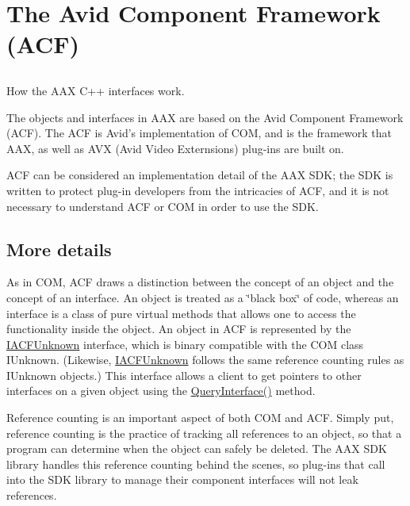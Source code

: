 \hypertarget{a00827}{}\section{The Avid Component Framework (A\+CF)}
\label{a00827}


\subsection{ }
How the A\+AX C++ interfaces work. 

The objects and interfaces in A\+AX are based on the Avid Component Framework (A\+CF). The A\+CF is Avid’s implementation of C\+OM, and is the framework that A\+AX, as well as A\+VX (Avid Video Externsions) plug-\/ins are built on.

A\+CF can be considered an implementation detail of the A\+AX S\+DK; the S\+DK is written to protect plug-\/in developers from the intricacies of A\+CF, and it is not necessary to understand A\+CF or C\+OM in order to use the S\+DK.\hypertarget{a00827_details}{}\subsection{More details}\label{a00827_details}
As in C\+OM, A\+CF draws a distinction between the concept of an object and the concept of an interface. An object is treated as a \char`\"{}black box\char`\"{} of code, whereas an interface is a class of pure virtual methods that allows one to access the functionality inside the object. An object in A\+CF is represented by the \mbox{\hyperlink{a01409}{I\+A\+C\+F\+Unknown}} interface, which is binary compatible with the C\+OM class I\+Unknown. (Likewise, \mbox{\hyperlink{a01409}{I\+A\+C\+F\+Unknown}} follows the same reference counting rules as I\+Unknown objects.) This interface allows a client to get pointers to other interfaces on a given object using the \mbox{\hyperlink{a01409_a8b7f0ae9c78d007ca76aa462ebe53135}{Query\+Interface()}} method.

Reference counting is an important aspect of both C\+OM and A\+CF. Simply put, reference counting is the practice of tracking all references to an object, so that a program can determine when the object can safely be deleted. The A\+AX S\+DK library handles this reference counting behind the scenes, so plug-\/ins that call into the S\+DK library to manage their component interfaces will not leak references.

